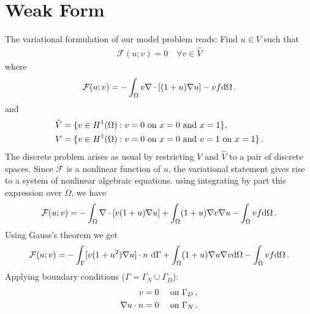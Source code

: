 \documentclass[]{article}
\begin{document}
\section{Weak Form} \label{sec: WF}
The variational formulation of our model problem reads: Find $u \in V$ such that
\begin{equation}\label{eq4}
	\begin{aligned}
		\mathcal{F}(u;v) = 0 \quad \forall v \in \hat{V}
		\end{aligned}
\end{equation}
where
\begin{equation}\label{eq5}
	\begin{aligned}
		\mathcal{F}(u; v) =-\int_\Omega v \nabla \cdot[(1+u) \nabla u] - v f \mathrm{d}\Omega\thinspace .
		\end{aligned}
\end{equation}
and
\begin{equation}\label{eq6}
	\begin{aligned}
		\hat{V} &= \{v \in H^1(\Omega) : v = 0 \text{ on } x=0\mbox{ and }x=1\}, \\
		 V &= \{v \in H^1(\Omega) : v = 0 \text{ on } x=0\text{ and } v = 1\text{ on }x=1\}\thinspace.
		\end{aligned}
\end{equation}
The discrete problem arises as usual by restricting $V$ and $\hat{V}$ to a pair of discrete spaces. Since $\mathcal{F}$ is a nonlinear function of $u$, the variational statement gives rise to a system of nonlinear algebraic equations. using integrating by part this expression over $\Omega$, we have
\begin{equation}\label{eq8}
	\begin{aligned}
		\mathcal{F}(u; v) = -\int_{\Omega} \nabla \cdot [v (1+u) \nabla u] + \int_{\Omega}  (1+u)\nabla v\nabla u - \int_{\Omega} v f \mathrm{d}\Omega\thinspace .
	\end{aligned}
\end{equation}
Using Gauss’s theorem we get
\begin{equation}\label{eq9}
	\begin{aligned}
		\mathcal{F}(u; v) =  -\int_{\Gamma} [v (1+u^2) \nabla u] \cdot n \ \mathrm{d} \Gamma + \int_{\Omega} (1+u)\nabla u \nabla v \mathrm{d} \Omega - \int_{\Omega} v f \mathrm{d} \Omega\thinspace .
	\end{aligned}
\end{equation}
Applying boundary conditions ($\Gamma = \Gamma_N \cup \Gamma_D$):
\begin{equation}\label{eq10}
	\begin{aligned}
		v= 0 \quad &\text{ on } \Gamma_D\thinspace, \\
		\nabla u \cdot n = 0 \quad &\text{ on } \Gamma_N \thinspace.
	\end{aligned}
\end{equation}
\end{document}
